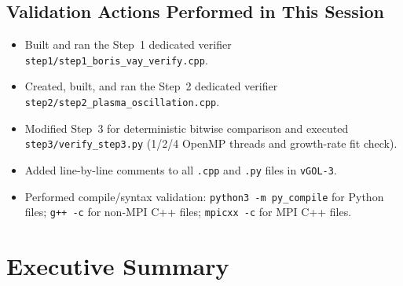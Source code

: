 \documentclass[11pt,a4paper]{article}
\begin{document}
\subsection{Validation Actions Performed in This Session}
\begin{itemize}[leftmargin=*]
  \item Built and ran the Step~1 dedicated verifier \texttt{step1/step1\_boris\_vay\_verify.cpp}.
  \item Created, built, and ran the Step~2 dedicated verifier \texttt{step2/step2\_plasma\_oscillation.cpp}.
  \item Modified Step~3 for deterministic bitwise comparison and executed \texttt{step3/verify\_step3.py} (1/2/4 OpenMP threads and growth-rate fit check).
  \item Added line-by-line comments to all \texttt{.cpp} and \texttt{.py} files in \texttt{vGOL-3}.
  \item Performed compile/syntax validation: \texttt{python3 -m py\_compile} for Python files; \texttt{g++ -c} for non-MPI C++ files; \texttt{mpicxx -c} for MPI C++ files.
\end{itemize}

\section{Executive Summary}
\end{document}
